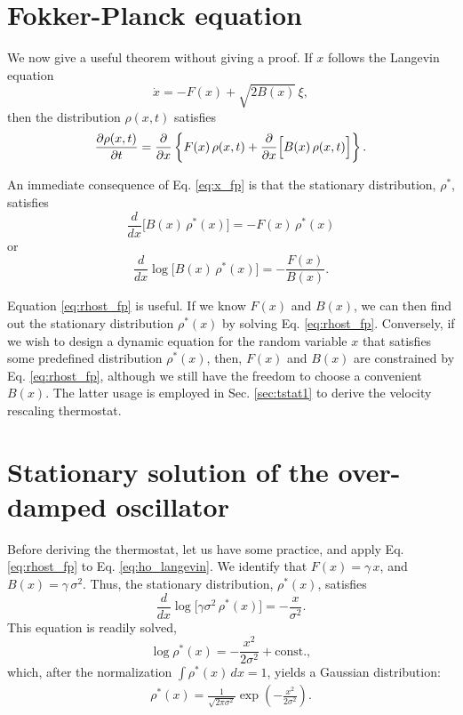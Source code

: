 \documentclass[11pt]{article}
\begin{document}
\section{Fokker-Planck equation}



We now give a useful theorem without giving a proof.
%
If $x$ follows the Langevin equation
\begin{equation}
  \dot x = -F(x) + \sqrt{ 2 B(x) } \, \xi,
  \label{eq:x_langevin}
\end{equation}
then the distribution $\rho(x, t)$ satisfies
\begin{equation}
\frac { \partial \rho(x, t) } { \partial t }
=
\frac { \partial } { \partial x }
\left\{
  F(x) \, \rho(x, t)
  +
  \frac { \partial  } { \partial x } \Bigl[ B(x) \, \rho(x, t) \Bigr]
\right\}.
\label{eq:x_fp}
\end{equation}

An immediate consequence of Eq. \eqref{eq:x_fp} is that
the stationary distribution, $\rho^*$, satisfies
\begin{equation*}
  \frac { d } { d x } \bigl[ B(x) \, \rho^*(x) \bigr]
=
  - F(x) \, \rho^*(x)
\end{equation*}
or
\begin{equation}
  \frac { d } { d x } \log\bigl[ B(x) \, \rho^*(x) \bigr]
=
  - \frac{ F(x) }{ B(x) }.
\label{eq:rhost_fp}
\end{equation}

Equation \eqref{eq:rhost_fp} is useful.
%
If we know $F(x)$ and $B(x)$,
we can then find out the stationary distribution $\rho^*(x)$
by solving Eq. \eqref{eq:rhost_fp}.
%
Conversely,
if we wish to design a dynamic equation for the random variable $x$
that satisfies some predefined distribution $\rho^*(x)$,
%
then, $F(x)$ and $B(x)$ are constrained by Eq. \eqref{eq:rhost_fp},
although we still have the freedom to choose a convenient $B(x)$.
%
The latter usage is employed in Sec. \ref{sec:tstat1} to derive
the velocity rescaling thermostat.



\section{\label{sec:rhost}
Stationary solution of the over-damped oscillator}



Before deriving the thermostat,
let us have some practice,
and apply Eq. \eqref{eq:rhost_fp} to Eq. \eqref{eq:ho_langevin}.
%
We identify that
$F(x) = \gamma \, x$,
and
$B(x) = \gamma \, \sigma^2$.
%
Thus, the stationary distribution, $\rho^*(x)$, satisfies
\[
  \frac { d } { d x } \log\bigl[ \gamma \sigma^2 \, \rho^*(x) \bigr]
=
  - \frac{ x }{ \sigma^2 }.
\]
This equation is readily solved,
\[
  \log \rho^*(x)
=
  - \frac{ x^2 }{ 2 \sigma^2 }
  + \mathrm{const.},
\]
which,
after the normalization $\int \rho^*(x) \, dx = 1$,
yields a Gaussian distribution:
\begin{align}
\rho^*(x)
=
\frac{ 1 } { \sqrt{ 2 \pi \sigma^2 } }
\exp\left(
  -\frac{ x^2 } { 2 \sigma^2 }
\right).
\label{eq:ho_rhost}
\end{align}
\end{document}

